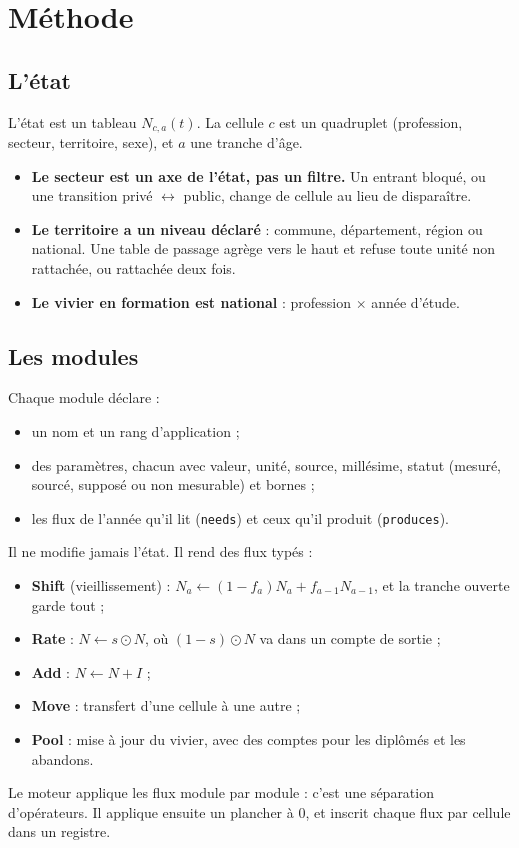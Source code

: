 \documentclass[11pt]{article}
\begin{document}
\section{Méthode}\label{sec:methode}

\subsection{L'état}
L'état est un tableau $N_{c,a}(t)$. La cellule $c$ est un quadruplet (profession, secteur,
territoire, sexe), et $a$ une tranche d'âge.
\begin{itemize}
  \item \textbf{Le secteur est un axe de l'état, pas un filtre.} Un entrant bloqué, ou une transition
        privé $\leftrightarrow$ public, change de cellule au lieu de disparaître.
  \item \textbf{Le territoire a un niveau déclaré} : commune, département, région ou national. Une
        table de passage agrège vers le haut et refuse toute unité non rattachée, ou rattachée deux
        fois.
  \item \textbf{Le vivier en formation est national} : profession $\times$ année d'étude.
\end{itemize}

\subsection{Les modules}
Chaque module déclare :
\begin{itemize}
  \item un nom et un rang d'application ;
  \item des paramètres, chacun avec valeur, unité, source, millésime, statut (mesuré, sourcé, supposé
        ou non mesurable) et bornes ;
  \item les flux de l'année qu'il lit (\texttt{needs}) et ceux qu'il produit (\texttt{produces}).
\end{itemize}
Il ne modifie jamais l'état. Il rend des flux typés :
\begin{itemize}
  \item \textbf{Shift} (vieillissement) :
        $N_a \leftarrow (1-f_a)N_a + f_{a-1}N_{a-1}$, et la tranche ouverte garde tout ;
  \item \textbf{Rate} : $N \leftarrow s \odot N$, où $(1-s)\odot N$ va dans un compte de sortie ;
  \item \textbf{Add} : $N \leftarrow N + I$ ;
  \item \textbf{Move} : transfert d'une cellule à une autre ;
  \item \textbf{Pool} : mise à jour du vivier, avec des comptes pour les diplômés et les abandons.
\end{itemize}
Le moteur applique les flux module par module : c'est une séparation d'opérateurs. Il applique
ensuite un plancher à 0, et inscrit chaque flux par cellule dans un registre.
\end{document}
